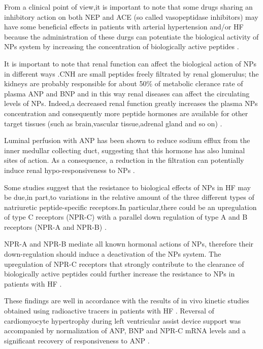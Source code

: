 \documentclass[14pt,a4paper,onecolumn]{extarticle}
\begin{document}
From a clinical point of view,it is important to note that some drugs sharing an inhibitory action on both NEP and ACE (so called vasopeptidase inhibitors) may have some beneficial effects in patients with arterial hypertension and/or HF because the administration of these durgs can potentiate the biological activity of NPs system by increasing the concentration of biologically active peptides \citep{bib340} \citep{bib341} \citep{bib342}.



It is important to note that renal function can affect the biological action of NPs in different ways .CNH are small peptides freely filtrated by renal glomerulus; the kidneys are probably responsible for about 50\% of metabolic clerance rate of plasma ANP and BNP and in this way renal diseases can affect the circulating levels of NPs.  Indeed,a decreased renal function greatly increases the plasma NPs concentration and consequently more peptide hormones are available for other target tissues (such as brain,vascular tissue,adrenal gland and so on) \citep{bib35}.



Luminal perfusion with ANP has been shown to reduce sodium efflux from the inner medullar collecting duct, suggesting that this hormone has also luminal sites of action.  As a consequence, a reduction in the filtration can potentially induce renal hypo-responsiveness to NPs \citep{bib325}.



Some studies suggest that the resistance to biological effects of NPs in HF may be due,in part,to variations in the relative amount of the three different types of natriuretic peptide-specific receptors.In particular,there could be an upregulation of type C receptors (NPR-C) with a parallel down regulation of type A and B receptors (NPR-A and NPR-B) \citep{bib343} \citep{bib347}.



NPR-A and NPR-B mediate all known hormonal actions of NPs, therefore their down-regulation should induce a deactivation of the NPs system. The upregulation of NPR-C receptors that strongly contribute to the clearance of biologically active peptides could further increase the resistance to NPs in patients with HF \citep{bib343}.



These findings are well in accordance with the results of in vivo kinetic studies obtained using radioactive tracers in patients with HF \citep{bib333}. Reversal of cardiomyocyte hypertrophy during left ventricular assist device support was accompanied by normalization of ANP, BNP and NPR-C mRNA levels and a significant recovery of responsiveness to ANP \citep{bib347}.
\end{document}
